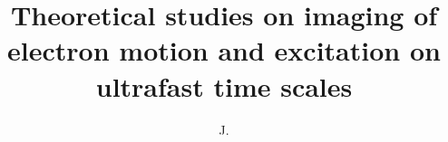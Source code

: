 \documentclass[defaultstyle,11pt]{thesis}
\title{Theoretical studies on imaging of electron motion and excitation on ultrafast time scales}
\author{J.}{Venzke}
\begin{document}









\nocite{*}		%

% 
% 
\end{document}
